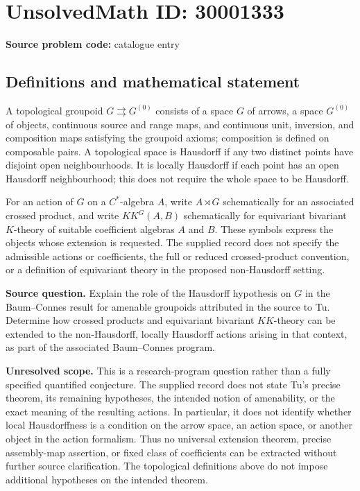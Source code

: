 \documentclass[11pt]{article}
\begin{document}
\section*{UnsolvedMath ID: 30001333}
\textbf{Source problem code:} catalogue entry
\subsection{Definitions and mathematical statement}
A topological groupoid \(G\rightrightarrows G^{(0)}\) consists of a space \(G\) of arrows, a space \(G^{(0)}\) of objects, continuous source and range maps, and continuous unit, inversion, and composition maps satisfying the groupoid axioms; composition is defined on composable pairs. A topological space is Hausdorff if any two distinct points have disjoint open neighbourhoods. It is locally Hausdorff if each point has an open Hausdorff neighbourhood; this does not require the whole space to be Hausdorff.

For an action of \(G\) on a \(C^*\)-algebra \(A\), write \(A\rtimes G\) schematically for an associated crossed product, and write \(KK^G(A,B)\) schematically for equivariant bivariant \(K\)-theory of suitable coefficient algebras \(A\) and \(B\). These symbols express the objects whose extension is requested. The supplied record does not specify the admissible actions or coefficients, the full or reduced crossed-product convention, or a definition of equivariant theory in the proposed non-Hausdorff setting.

\textbf{Source question.} Explain the role of the Hausdorff hypothesis on \(G\) in the Baum--Connes result for amenable groupoids attributed in the source to Tu. Determine how crossed products and equivariant bivariant \(KK\)-theory can be extended to the non-Hausdorff, locally Hausdorff actions arising in that context, as part of the associated Baum--Connes program.

\textbf{Unresolved scope.} This is a research-program question rather than a fully specified quantified conjecture. The supplied record does not state Tu's precise theorem, its remaining hypotheses, the intended notion of amenability, or the exact meaning of the resulting actions. In particular, it does not identify whether local Hausdorffness is a condition on the arrow space, an action space, or another object in the action formalism. Thus no universal extension theorem, precise assembly-map assertion, or fixed class of coefficients can be extracted without further source clarification. The topological definitions above do not impose additional hypotheses on the intended theorem.
\end{document}
